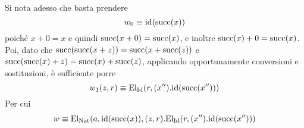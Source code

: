 Si nota adesso che basta prendere
\[ w_0 \equiv \mathrm{id}(\mathrm{succ}(x))\] poiché $x+0 = x$ e quindi $\mathrm{succ}(x+0) = \mathrm{succ}(x)$, e inoltre $\mathrm{succ}(x)+0 = \mathrm{succ}(x)$. Poi, dato che $\mathrm{succ}(\mathrm{succ}(x+z)) = \mathrm{succ}(x+\mathrm{succ}(z))$ e $\mathrm{succ}(\mathrm{succ}(x)+z) = \mathrm{succ}(x)+\mathrm{succ}(z)$, applicando opportunamente conversioni e sostituzioni, è sufficiente porre
\[ w_1(z, r) \equiv \mathrm{El}_{\mathrm{Id}}(r, (x'').\mathrm{id}(\mathrm{succ}(x'')))\]
Per cui
\[w \equiv \mathrm{El}_{\mathrm{Nat}}(a, \mathrm{id}(\mathrm{succ}(x)), (z,r).\mathrm{El}_{\mathrm{Id}}(r, (x'').\mathrm{id}(\mathrm{succ}(x''))) \]

\endproof